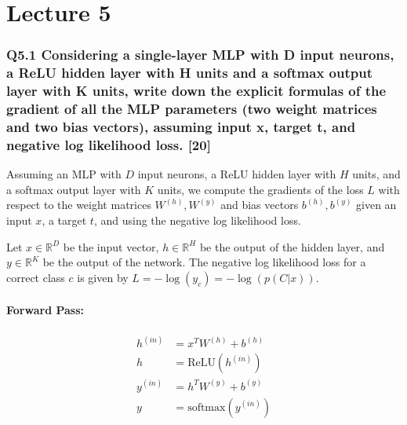 \documentclass[11pt]{article}
\begin{document}
\part{Lecture 5}

\section{Q5.1 Considering a single-layer MLP with D input neurons, a ReLU hidden layer with H units and a softmax output layer with K units, write down the explicit formulas of the gradient of all the MLP parameters (two weight matrices and two bias vectors), assuming input x, target t, and negative log likelihood loss. [20]}

Assuming an MLP with \( D \) input neurons, a ReLU hidden layer with \( H \) units, and a softmax output layer with \( K \) units, we compute the gradients of the loss \( L \) with respect to the weight matrices \( W^{(h)}, W^{(y)} \) and bias vectors \( b^{(h)}, b^{(y)} \) given an input \( x \), a target \( t \), and using the negative log likelihood loss.

Let \( x \in \mathbb{R}^D \) be the input vector, \( h \in \mathbb{R}^H \) be the output of the hidden layer, and \( y \in \mathbb{R}^K \) be the output of the network. The negative log likelihood loss for a correct class \( c \) is given by \( L = -\log(y_c) = -\log(p(C | x))\).

\subsection*{Forward Pass:}
\begin{align*}
h^{(in)} &= x^T W^{(h)} + b^{(h)} \\
h &= \text{ReLU}(h^{(in)}) \\
y^{(in)} &= h^T W^{(y)} + b^{(y)} \\
y &= \text{softmax}(y^{(in)})
\end{align*}
\end{document}
